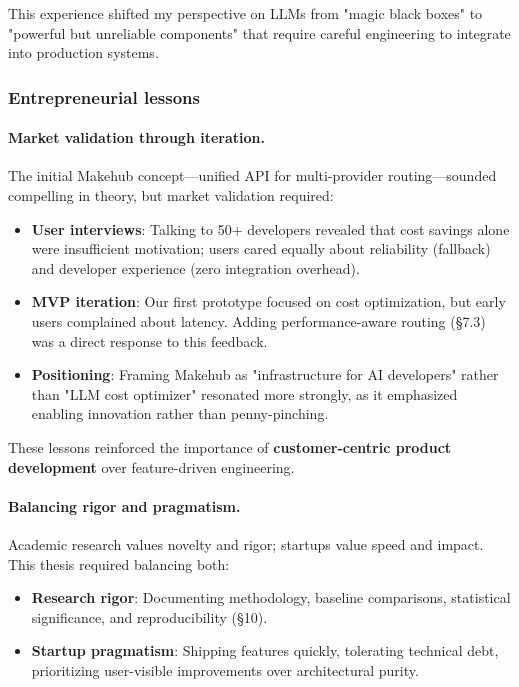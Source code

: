 \documentclass[english]{article}
\begin{document}
This experience shifted my perspective on LLMs from "magic black boxes" to "powerful but unreliable components" that require careful engineering to integrate into production systems.

\subsubsection{Entrepreneurial lessons}

\paragraph{Market validation through iteration.}

The initial Makehub concept—unified API for multi-provider routing—sounded compelling in theory, but market validation required:
\begin{itemize}
    \item \textbf{User interviews}: Talking to 50+ developers revealed that cost savings alone were insufficient motivation; users cared equally about reliability (fallback) and developer experience (zero integration overhead).
    \item \textbf{MVP iteration}: Our first prototype focused on cost optimization, but early users complained about latency. Adding performance-aware routing (§7.3) was a direct response to this feedback.
    \item \textbf{Positioning}: Framing Makehub as "infrastructure for AI developers" rather than "LLM cost optimizer" resonated more strongly, as it emphasized enabling innovation rather than penny-pinching.
\end{itemize}

These lessons reinforced the importance of \textbf{customer-centric product development} over feature-driven engineering.

\paragraph{Balancing rigor and pragmatism.}

Academic research values novelty and rigor; startups value speed and impact. This thesis required balancing both:
\begin{itemize}
    \item \textbf{Research rigor}: Documenting methodology, baseline comparisons, statistical significance, and reproducibility (§10).
    \item \textbf{Startup pragmatism}: Shipping features quickly, tolerating technical debt, prioritizing user-visible improvements over architectural purity.
\end{itemize}
\end{document}

